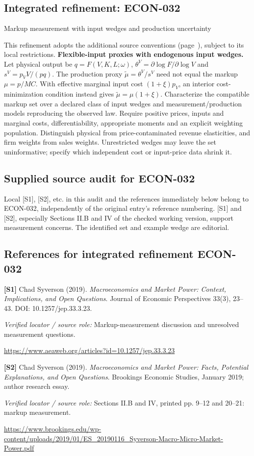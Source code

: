 \documentclass[11pt,a4paper]{article}
\begin{document}
\subsection*{Integrated refinement: ECON-032}
{\sffamily\small\color{muted}Markup measurement with input wedges and production uncertainty\par}
This refinement adopts the additional source conventions
(page~\pageref{audited:conventions}), subject to its local restrictions.
\textbf{Flexible-input proxies with endogenous input wedges.}
Let physical output be $q=F(V,K,L;\omega)$,
$\theta^V=\partial\log F/\partial\log V$ and $s^V=p_VV/(pq)$.
The production proxy $\widetilde\mu=\theta^V/s^V$ need not equal
the markup $\mu=p/MC$. With effective marginal input cost $(1+\xi)p_V$,
an interior cost-minimization condition instead gives
$\widetilde\mu=\mu(1+\xi)$. Characterize the compatible markup set over a declared
class of input wedges and measurement/production models reproducing the observed
law. Require positive prices, inputs and marginal costs, differentiability,
appropriate moments and an explicit weighting population. Distinguish physical
from price-contaminated revenue elasticities, and firm weights from sales weights.
Unrestricted wedges may leave the set uninformative; specify which independent
cost or input-price data shrink it.
\subsection*{Supplied source audit for ECON-032}
Local [S1], [S2], etc. in this audit and the references immediately below
belong to ECON-032, independently of the original entry's reference numbering.
[S1] and [S2], especially Sections II.B and IV of the checked working version, support measurement concerns. The identified set and example wedge are editorial.
\subsection*{References for integrated refinement ECON-032}
{\footnotesize\raggedright
\par\noindent\textbf{[S1]} Chad Syverson (2019). \emph{Macroeconomics and Market Power: Context, Implications, and Open Questions}. Journal of Economic Perspectives 33(3), 23–43. DOI: 10.1257/jep.33.3.23.\par \textit{Verified locator / source role:} Markup-measurement discussion and unresolved measurement questions.\par \url{https://www.aeaweb.org/articles?id=10.1257/jep.33.3.23}\par\smallskip
\par\noindent\textbf{[S2]} Chad Syverson (2019). \emph{Macroeconomics and Market Power: Facts, Potential Explanations, and Open Questions}. Brookings Economic Studies, January 2019; author research essay.\par \textit{Verified locator / source role:} Sections II.B and IV, printed pp. 9–12 and 20–21: markup measurement.\par \url{https://www.brookings.edu/wp-content/uploads/2019/01/ES_20190116_Syverson-Macro-Micro-Market-Power.pdf}\par\smallskip
}
\end{document}
